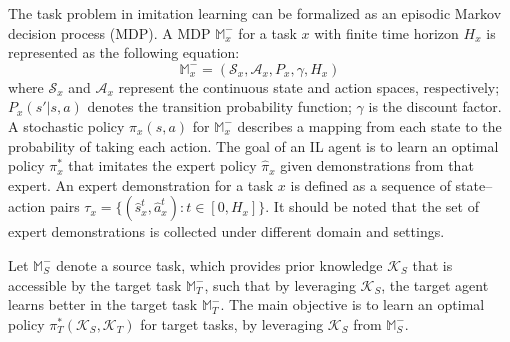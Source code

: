 The task problem in imitation learning can be formalized as an episodic Markov decision process (MDP).
A MDP $\mathbb{M}^-_x$ for a task $x$ with finite time horizon $H_x$ \cite{RL_AnIntroductionBook} is represented as the following equation:
\begin{equation}
  \mathbb{M}^-_x = (\mathcal{S}_x, \mathcal{A}_x, P_x, \gamma, H_x)
\end{equation}
where
$\mathcal{S}_x$ and $\mathcal{A}_x$ represent the continuous state and action spaces, respectively;
$P_x(s'|s,a)$ denotes the transition probability function;
$\gamma$ is the discount factor.
A stochastic policy $\pi_x(s,a)$ for $\mathbb{M}^-_x$
describes a mapping from each state to the probability of taking each action.
The goal of an IL agent is to learn an optimal policy $\pi^{*}_x$ that imitates the expert policy $\hat{\pi}_x$ given demonstrations from that expert.
An expert demonstration for a task $x$ is defined as a sequence of state--action pairs $\tau_{x} = \{(\hat{s}^t_{x}, \hat{a}^t_{x}) : t \in [0, H_x]\}$.
It should be noted that the set of expert demonstrations is collected under different domain and settings.

Let $\mathbb{M}^-_{S}$ denote a source task,
which provides prior knowledge $\mathcal{K}_S$ that is accessible by the target task $\mathbb{M}^-_T$,
such that by leveraging $\mathcal{K}_S$,
the target agent learns better in the target task $\mathbb{M}^-_T$.
The main objective is to learn an optimal policy $\pi^{*}_{T}(\mathcal{K}_S, \mathcal{K}_T)$ for target tasks,
by leveraging $\mathcal{K}_S$ from $\mathbb{M}^-_S$.
